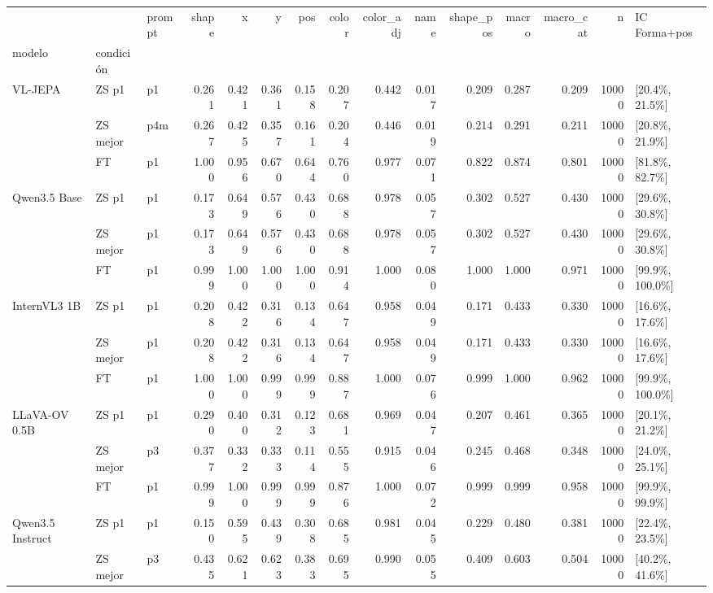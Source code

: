 \begin{tabular}{lllrrrrrrrrrrrl}
\toprule
 &  & prompt & shape & x & y & pos & color & color\_adj & name & shape\_pos & macro & macro\_cat & n & IC Forma+pos \\
modelo & condición &  &  &  &  &  &  &  &  &  &  &  &  &  \\
\midrule
\multirow[t]{3}{*}{VL-JEPA} & ZS p1 & p1 & 0.261 & 0.421 & 0.361 & 0.158 & 0.207 & 0.442 & 0.017 & 0.209 & 0.287 & 0.209 & 10000 & [20.4\%, 21.5\%] \\
 & ZS mejor & p4m & 0.267 & 0.425 & 0.357 & 0.161 & 0.204 & 0.446 & 0.019 & 0.214 & 0.291 & 0.211 & 10000 & [20.8\%, 21.9\%] \\
 & FT & p1 & 1.000 & 0.956 & 0.670 & 0.644 & 0.760 & 0.977 & 0.071 & 0.822 & 0.874 & 0.801 & 10000 & [81.8\%, 82.7\%] \\
\cline{1-15}
\multirow[t]{3}{*}{Qwen3.5 Base} & ZS p1 & p1 & 0.173 & 0.649 & 0.576 & 0.430 & 0.688 & 0.978 & 0.057 & 0.302 & 0.527 & 0.430 & 10000 & [29.6\%, 30.8\%] \\
 & ZS mejor & p1 & 0.173 & 0.649 & 0.576 & 0.430 & 0.688 & 0.978 & 0.057 & 0.302 & 0.527 & 0.430 & 10000 & [29.6\%, 30.8\%] \\
 & FT & p1 & 0.999 & 1.000 & 1.000 & 1.000 & 0.914 & 1.000 & 0.080 & 1.000 & 1.000 & 0.971 & 10000 & [99.9\%, 100.0\%] \\
\cline{1-15}
\multirow[t]{3}{*}{InternVL3 1B} & ZS p1 & p1 & 0.208 & 0.422 & 0.316 & 0.134 & 0.647 & 0.958 & 0.049 & 0.171 & 0.433 & 0.330 & 10000 & [16.6\%, 17.6\%] \\
 & ZS mejor & p1 & 0.208 & 0.422 & 0.316 & 0.134 & 0.647 & 0.958 & 0.049 & 0.171 & 0.433 & 0.330 & 10000 & [16.6\%, 17.6\%] \\
 & FT & p1 & 1.000 & 1.000 & 0.999 & 0.999 & 0.887 & 1.000 & 0.076 & 0.999 & 1.000 & 0.962 & 10000 & [99.9\%, 100.0\%] \\
\cline{1-15}
\multirow[t]{3}{*}{LLaVA-OV 0.5B} & ZS p1 & p1 & 0.290 & 0.400 & 0.312 & 0.123 & 0.681 & 0.969 & 0.047 & 0.207 & 0.461 & 0.365 & 10000 & [20.1\%, 21.2\%] \\
 & ZS mejor & p3 & 0.377 & 0.332 & 0.333 & 0.114 & 0.555 & 0.915 & 0.046 & 0.245 & 0.468 & 0.348 & 10000 & [24.0\%, 25.1\%] \\
 & FT & p1 & 0.999 & 1.000 & 0.999 & 0.999 & 0.876 & 1.000 & 0.072 & 0.999 & 0.999 & 0.958 & 10000 & [99.9\%, 99.9\%] \\
\cline{1-15}
\multirow[t]{2}{*}{Qwen3.5 Instruct} & ZS p1 & p1 & 0.150 & 0.595 & 0.439 & 0.308 & 0.685 & 0.981 & 0.045 & 0.229 & 0.480 & 0.381 & 10000 & [22.4\%, 23.5\%] \\
 & ZS mejor & p3 & 0.435 & 0.621 & 0.623 & 0.383 & 0.695 & 0.990 & 0.055 & 0.409 & 0.603 & 0.504 & 10000 & [40.2\%, 41.6\%] \\
\cline{1-15}
\bottomrule
\end{tabular}
